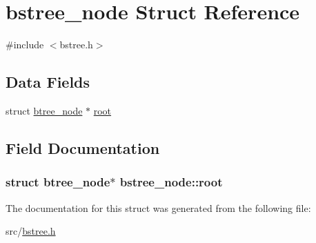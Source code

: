 \hypertarget{structbstree__node}{\section{bstree\-\_\-node Struct Reference}
\label{structbstree__node}
}


{\ttfamily \#include $<$bstree.\-h$>$}

\subsection*{Data Fields}
\begin{DoxyCompactItemize}
\item 
struct \hyperlink{structbtree__node}{btree\-\_\-node} $\ast$ \hyperlink{structbstree__node_ab4da12d54edd7f738014b2f34a139117}{root}
\end{DoxyCompactItemize}


\subsection{Field Documentation}
\hypertarget{structbstree__node_ab4da12d54edd7f738014b2f34a139117}{
\subsubsection[{root}]{\setlength{\rightskip}{0pt plus 5cm}struct {\bf btree\-\_\-node}$\ast$ bstree\-\_\-node\-::root}}\label{structbstree__node_ab4da12d54edd7f738014b2f34a139117}


The documentation for this struct was generated from the following file\-:\begin{DoxyCompactItemize}
\item 
src/\hyperlink{bstree_8h}{bstree.\-h}\end{DoxyCompactItemize}
